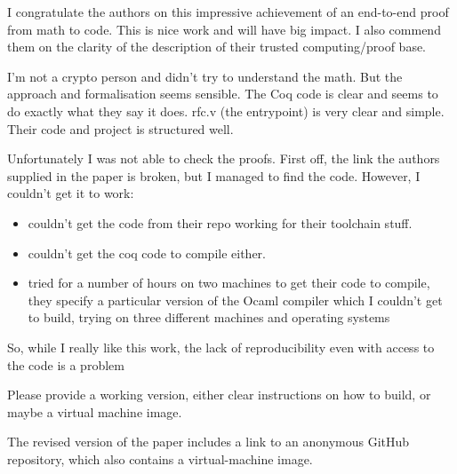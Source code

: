 I congratulate the authors on this impressive achievement of an end-to-end proof from math to code. This is nice work and will have big impact. I also commend them on the clarity of the description of their trusted computing/proof base.

I'm not a crypto person and didn't try to understand the math. But the approach and formalisation seems sensible. The Coq code is clear and seems to do exactly what they say it does. rfc.v (the entrypoint) is very clear and simple. Their code and project is structured well.

Unfortunately I was not able to check the proofs. First off, the link the authors supplied in the paper is broken, but I managed to find the code. However, I couldn't get it to work:
\begin{itemize}
    \item couldn't get the code from their repo working for their toolchain stuff.
    \item couldn't get the coq code to compile either.
    \item tried for a number of hours on two machines to get their code to compile, they specify a particular version of the Ocaml compiler which I couldn't get to build, trying on three different machines and operating systems
\end{itemize}

So, while I really like this work, the lack of reproducibility even with access to the code is a problem

\begin{center}
\end{center}

Please provide a working version, either clear instructions on how to build, or maybe a virtual machine image.

\begin{answer}
  The revised version of the paper includes a link to an anonymous GitHub repository, 
  which also contains a virtual-machine image.
\end{answer}
